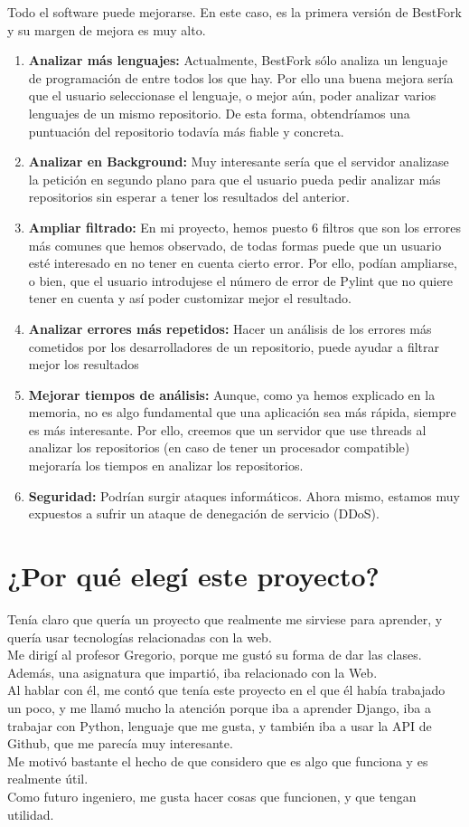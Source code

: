 \documentclass[a4paper, 12pt]{book}
\begin{document}
Todo el software puede mejorarse. En este caso, es la primera versión de BestFork y su margen de mejora es muy alto.\\
\begin{enumerate}
  \item \textbf{Analizar más lenguajes:} Actualmente, BestFork sólo analiza un lenguaje de programación de entre todos los que hay. Por ello una buena mejora sería que el usuario seleccionase el lenguaje, o mejor aún, poder analizar varios lenguajes de un mismo repositorio. De esta forma, obtendríamos una puntuación del repositorio todavía más fiable y concreta.
  \item \textbf{Analizar en Background:} Muy interesante
   sería que el servidor analizase la petición en segundo plano para que el usuario pueda pedir analizar más repositorios sin esperar a tener los resultados del anterior.
    \item \textbf{Ampliar filtrado:} En mi proyecto, hemos puesto 6 filtros que son los errores más comunes que hemos observado, de todas formas puede que un usuario esté interesado en no tener en cuenta cierto error. Por ello, podían ampliarse, o bien, que el usuario introdujese el número de error de Pylint que no quiere tener en cuenta y así poder customizar mejor el resultado.
  \item \textbf{Analizar errores más repetidos:} Hacer un análisis de los errores más cometidos por los desarrolladores de un repositorio, puede ayudar a filtrar mejor los resultados
    \item \textbf{Mejorar tiempos de análisis:} Aunque, como ya hemos explicado en la memoria, no es algo fundamental que una aplicación sea más rápida, siempre es más interesante. Por ello, creemos que un servidor que use threads al analizar los repositorios (en caso de tener un procesador compatible) mejoraría los tiempos en analizar los repositorios.
        \item \textbf{Seguridad:} Podrían surgir ataques informáticos. Ahora mismo, estamos muy expuestos a sufrir un ataque de denegación de servicio (DDoS).
\end{enumerate}

\section{¿Por qué elegí este proyecto?}
Tenía claro que quería un proyecto que realmente me sirviese para aprender, y quería usar tecnologías relacionadas con la web.\\
Me dirigí al profesor Gregorio, porque me gustó su forma de dar las clases. Además, una asignatura que impartió, iba relacionado con la Web.\\
Al hablar con él, me contó que tenía este proyecto en el que él había trabajado un poco, y me llamó mucho la atención porque iba a aprender Django, iba a trabajar con Python, lenguaje que me gusta, y también iba a usar la API de Github, que me parecía muy interesante.\\
Me motivó bastante el hecho de que considero que es algo que funciona y es realmente útil.\\
Como futuro ingeniero, me gusta hacer cosas que funcionen, y que tengan utilidad.
\end{document}

